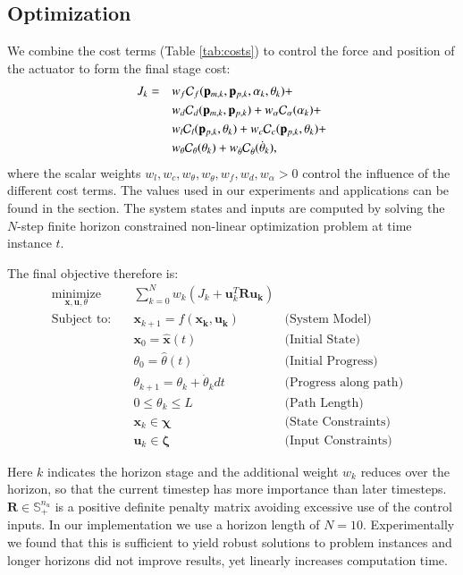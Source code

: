 \subsection{Optimization}
We combine the cost terms (Table \ref{tab:costs}) to control the force and position of the actuator to form the final stage cost:
%
\begin{align}\label{eq:J_k}
J_k= \quad 
     & w_f \mathcal{C}_f(\mathbf{p}_{m,k}, \mathbf{p}_{p,k}, \alpha_k, \theta_k) + \nonumber \\
     & w_d \mathcal{C}_d(\mathbf{p}_{m,k}, \mathbf{p}_{p,k}) + w_\alpha \mathcal{C}_{\alpha}(\alpha_k)+ \nonumber \\
	 &	 w_l \mathcal{C}_l(\mathbf{p}_{p,k}, \theta_k) +  w_c \mathcal{C}_c(\mathbf{p}_{p,k}, \theta_k) + \nonumber \\
     & w_{\theta} \mathcal{C}_{\theta}(\theta_k) +  w_{\dot{\theta}} \mathcal{C}_{\dot{\theta}}(\dot{\theta}_k),
\end{align}
%
where the scalar weights $w_l,w_c,w_{\theta},w_{\dot{\theta}},w_f,w_d, w_{\alpha}>0$ control the influence of the different cost terms. 
The values used in our experiments and applications can be found in the  section.
The system states and inputs are computed by solving the $N$-step finite horizon constrained non-linear optimization problem at time instance $t$. 

The final objective therefore is:
\begin{align}
\label{eq:mpcc-formulation}
\underset{\mathbf{x}, \mathbf{u}, \theta}{\text{minimize}}\quad & \sum_{k=0}^{N} w_k\left ( J_k + \mathbf{u}_k^T \mathbf{R} \mathbf{u_k} \right ) && \\
\text{Subject to:}\quad & \mathbf{x} _{k+1} = f(\mathbf{x_k}, \mathbf{u_k}) & \text{(System Model)} \nonumber\\
                        & \mathbf{x}_0 = \hat{\mathbf{x}}(t) & \text{(Initial State)} \nonumber \\
                        & \theta_0 = \hat{\theta}(t) & \text{(Initial Progress)} \nonumber \\
                        & \theta_{k+1} = \theta_k + \dot{\theta}_k dt & \text{(Progress along path)} \nonumber \\
                        & 0 \leq \theta_k \leq L& \text{(Path Length)} \nonumber \\
                        & \mathbf{x}_k \in \boldsymbol{\chi} & \text{(State Constraints)} \nonumber \\
                        & \mathbf{u}_k \in \boldsymbol{\zeta} & \text{(Input Constraints)} \nonumber
\end{align}

Here $k$ indicates the horizon stage and the additional weight $w_k$ reduces over the horizon, so that the current timestep has more importance than later timesteps. 
$\mathbf{R}\in\mathbb{S}_+^{n_u}$ is a positive definite penalty matrix avoiding excessive use of the control inputs. 
In our implementation we use a horizon length of $N=10$. 
Experimentally we found that this is sufficient to yield robust solutions to problem instances and longer horizons did not improve results, yet linearly increases computation time. 

% 